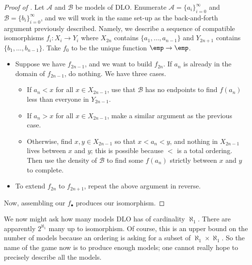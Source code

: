 \documentclass[../notes.tex]{subfiles}
\begin{document}
\begin{proof}[Proof of ]
	Let $\mathcal A$ and $\mathcal B$ be models of $\mathrm{DLO}$. Enumerate $\mathcal A=\{a_i\}_{i=0}^\infty$ and $\mathcal B=\{b_i\}_{i=0}^\infty$, and we will work in the same set-up as the back-and-forth argument previously described. Namely, we describe a sequence of compatible isomorphisms $f_i\colon X_i\to Y_i$ where $X_{2n}$ contains $\{a_1,\ldots,a_{n-1}\}$ and $Y_{2n+1}$ contains $\{b_1,\ldots,b_{n-1}\}$. Take $f_0$ to be the unique function $\emp\to\emp$.
	\begin{itemize}
		\item Suppose we have $f_{2n-1}$, and we want to build $f_{2n}$. If $a_n$ is already in the domain of $f_{2n-1}$, do nothing. We have three cases.
		\begin{itemize}
			\item If $a_n<x$ for all $x\in X_{2n-1}$, use that $\mathcal B$ has no endpoints to find $f(a_n)$ less than everyone in $Y_{2n-1}$.
			\item If $a_n>x$ for all $x\in X_{2n-1}$, make a similar argument as the previous case.
			\item Otherwise, find $x,y\in X_{2n-1}$ so that $x<a_n<y$, and nothing in $X_{2n-1}$ lives between $x$ and $y$; this is possible because $<$ is a total ordering. Then use the density of $\mathcal B$ to find some $f(a_n)$ strictly between $x$ and $y$ to complete.
		\end{itemize}
		\item To extend $f_{2n}$ to $f_{2n+1}$, repeat the above argument in reverse.
	\end{itemize}
	Now, assembling our $f_\bullet$ produces our isomorphism.
\end{proof}
\begin{remark}
	We now might ask how many models $\mathrm{DLO}$ has of cardinality $\aleph_1$. There are apparently $2^{\aleph_1}$ many up to isomorphism. Of course, this is an upper bound on the number of models because an ordering is asking for a subset of $\aleph_1\times\aleph_1$. So the name of the game now is to produce enough models; one cannot really hope to precisely describe all the models.
\end{remark}
\end{document}
